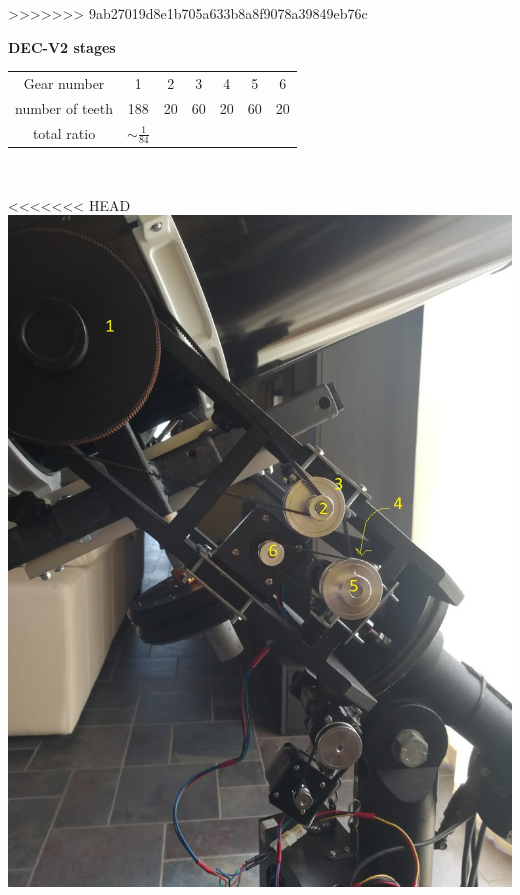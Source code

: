 \documentclass{article}
\begin{document}
\begin{multicols}{2}
>>>>>>> 9ab27019d8e1b705a633b8a8f9078a39849eb76c
        \begin{minipage}
            {0.5\textwidth}
            \centering
            \textbf{DEC-V2 stages}\\
            \begin{tabular}{ccccccc}
                \hline
                Gear number & 1 & 2 & 3 & 4 & 5 & 6\\
                number of teeth & 188 & 20 & 60 & 20 & 60 & 20\\
                \hline
                total ratio & \(\sim \frac{1}{84}\) &&&
            \end{tabular}
            \label{tab:DEC_gear_spec_v2}
        \end{minipage}
        \\
        \begin{minipage}
            {0.5\textwidth}
            \centering
<<<<<<< HEAD
            \includegraphics[scale=.19]{DEC_v2.jpg}

\end{minipage}
\end{multicols}
\end{document}
